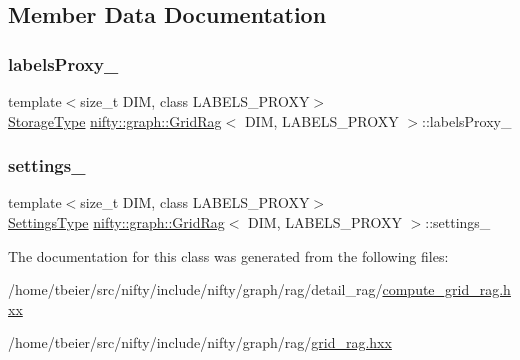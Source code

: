 \subsection{Member Data Documentation}
\mbox{\label{classnifty_1_1graph_1_1GridRag_abaacb5cd2582a08e27ec4af04f5e9881}} 
\subsubsection{\texorpdfstring{labels\+Proxy\+\_\+}{labelsProxy\_}}
{\footnotesize\ttfamily template$<$size\+\_\+t D\+IM, class L\+A\+B\+E\+L\+S\+\_\+\+P\+R\+O\+XY$>$ \\
\hyperlink{classnifty_1_1graph_1_1GridRag_ae7dcf657b20ef49d062648978e192cdb}{Storage\+Type} \hyperlink{classnifty_1_1graph_1_1GridRag}{nifty\+::graph\+::\+Grid\+Rag}$<$ D\+IM, L\+A\+B\+E\+L\+S\+\_\+\+P\+R\+O\+XY $>$\+::labels\+Proxy\+\_\+\hspace{0.3cm}{\ttfamily [protected]}}

\mbox{\label{classnifty_1_1graph_1_1GridRag_af4610f430b2ed52e5a4ea54c1eddcaf1}} 
\subsubsection{\texorpdfstring{settings\+\_\+}{settings\_}}
{\footnotesize\ttfamily template$<$size\+\_\+t D\+IM, class L\+A\+B\+E\+L\+S\+\_\+\+P\+R\+O\+XY$>$ \\
\hyperlink{structnifty_1_1graph_1_1GridRag_1_1SettingsType}{Settings\+Type} \hyperlink{classnifty_1_1graph_1_1GridRag}{nifty\+::graph\+::\+Grid\+Rag}$<$ D\+IM, L\+A\+B\+E\+L\+S\+\_\+\+P\+R\+O\+XY $>$\+::settings\+\_\+\hspace{0.3cm}{\ttfamily [protected]}}



The documentation for this class was generated from the following files\+:\begin{DoxyCompactItemize}
\item 
/home/tbeier/src/nifty/include/nifty/graph/rag/detail\+\_\+rag/\hyperlink{compute__grid__rag_8hxx}{compute\+\_\+grid\+\_\+rag.\+hxx}\item 
/home/tbeier/src/nifty/include/nifty/graph/rag/\hyperlink{grid__rag_8hxx}{grid\+\_\+rag.\+hxx}\end{DoxyCompactItemize}
